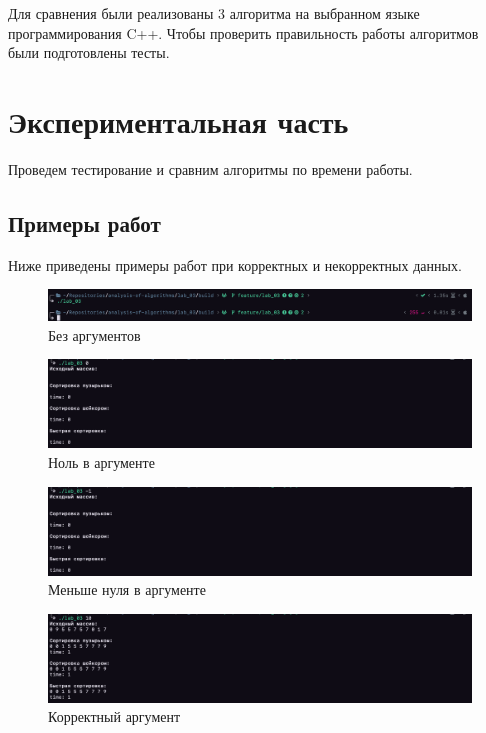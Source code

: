 \documentclass[a4paper,12pt]{article}
\begin{document}
Для сравнения были реализованы 3 алгоритма на выбранном языке
программирования C++. Чтобы проверить правильность работы алгоритмов
были подготовлены тесты.

\newpage
\section{Экспериментальная часть}

Проведем тестирование и сравним алгоритмы по времени работы.

\subsection{Примеры работ}

Ниже приведены примеры работ при корректных и некорректных данных.

\begin{figure}[H]
    \centering
    \includegraphics[scale=0.4]{zero_arg}
    \caption{Без аргументов}
    \label{img:zero-arg}
\end{figure}

\begin{figure}[H]
    \centering
    \includegraphics[scale=0.4]{zero}
    \caption{Ноль в аргументе}
    \label{img:zero}
\end{figure}

\begin{figure}[H]
    \centering
    \includegraphics[scale=0.4]{less_zero}
    \caption{Меньше нуля в аргументе}
    \label{img:less-zero}
\end{figure}

\begin{figure}[H]
    \centering
    \includegraphics[scale=0.4]{normal}
    \caption{Корректный аргумент}
    \label{img:normal}
\end{figure}
\end{document}
